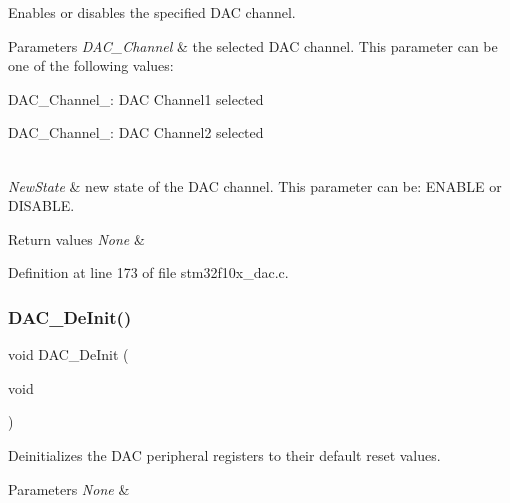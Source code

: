 Enables or disables the specified D\+AC channel. 


\begin{DoxyParams}{Parameters}
{\em D\+A\+C\+\_\+\+Channel} & the selected D\+AC channel. This parameter can be one of the following values\+: \begin{DoxyItemize}
\item D\+A\+C\+\_\+\+Channel\+\_\+: D\+AC Channel1 selected \item D\+A\+C\+\_\+\+Channel\+\_\+: D\+AC Channel2 selected \end{DoxyItemize}
\\
\hline
{\em New\+State} & new state of the D\+AC channel. This parameter can be\+: E\+N\+A\+B\+LE or D\+I\+S\+A\+B\+LE. \\
\hline
\end{DoxyParams}

\begin{DoxyRetVals}{Return values}
{\em None} & \\
\hline
\end{DoxyRetVals}


Definition at line 173 of file stm32f10x\+\_\+dac.\+c.

\mbox{\label{group___d_a_c___exported___functions_ga1fae225204e1e049d6795319e99ba8bc}} 
\subsubsection{\texorpdfstring{D\+A\+C\+\_\+\+De\+Init()}{DAC\_DeInit()}}
{\footnotesize\ttfamily void D\+A\+C\+\_\+\+De\+Init (\begin{DoxyParamCaption}\item[{void}]{ }\end{DoxyParamCaption})}



Deinitializes the D\+AC peripheral registers to their default reset values. 


\begin{DoxyParams}{Parameters}
{\em None} & \\
\hline
\end{DoxyParams}

